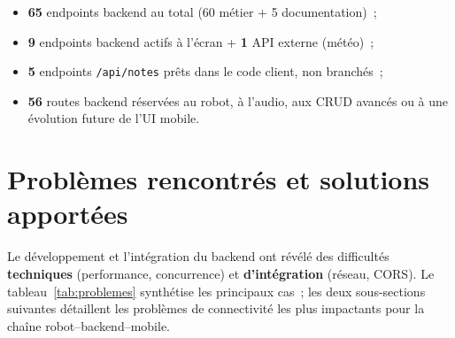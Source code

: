 \documentclass[a4paper,12pt]{report}
\begin{document}
	\begin{tcolorbox}[colback=gray!5!white, colframe=gray!60!black,
		title=\textbf{Synthèse de consommation --- KodaMate}]
		\begin{itemize}[noitemsep]
			\item \textbf{65} endpoints backend au total (60 métier + 5 documentation)~;
			\item \textbf{9} endpoints backend actifs à l'écran + \textbf{1} API externe (météo)~;
			\item \textbf{5} endpoints \texttt{/api/notes} prêts dans le code client, non branchés~;
			\item \textbf{56} routes backend réservées au robot, à l'audio, aux CRUD avancés ou à
			une évolution future de l'UI mobile.
		\end{itemize}
	\end{tcolorbox}
	
	\section{Problèmes rencontrés et solutions apportées}
	\label{sec:ch4-problemes}
	
	Le développement et l'intégration du backend ont révélé des difficultés
	\textbf{techniques} (performance, concurrence) et \textbf{d'intégration}
	(réseau, CORS). Le tableau~\ref{tab:problemes} synthétise les principaux cas~;
	les deux sous-sections suivantes détaillent les problèmes de connectivité les
	plus impactants pour la chaîne robot--backend--mobile.
	
\end{document}
